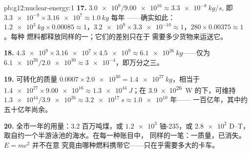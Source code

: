 \begin{solution}{pb:g12:nuclear-energy:1}
\textbf{17.} $\num{3.0e9}/\num{9.00e16} \approx \qty{3.3e-8}{kg/s}$,
即 $\num{3.3e-8} \times \num{3.16e7} \approx \qty{1.0}{kg}$ 每年
——确实如此：$\qty{1.2e3}{kg} \times 0.00085 \approx 1$，$\num{3.2e9}
\times \num{3.3e-10} \approx 1$，$280 \times 0.00375 \approx 1$。每种
燃料都释放同样的一；它们的差别只在于
需要多少货物来运送它。

\textbf{18.} $\num{4.3e9} \times \num{3.16e7} \times \num{4.5e9}
\approx \qty{6.1e26}{kg}$——仅为 $\num{6.1e26}/\num{2.0e30} \approx
\num{3e-4}$，即万分之三。

\textbf{19.} 可转化的质量 $0.0007 \times \num{2.0e30} =
\qty{1.4e27}{kg}$，相当于 $\num{1.4e27} \times \num{9.00e16} \approx
\qty{1.3e44}{J}$；在 \qty{3.9e26}{W} 的下，可维持 $\num{1.3e44}/
\num{3.9e26} \approx \qty{3.2e17}{s} \approx \num{1.0e10}$ 年——
一百亿年，其中约五十亿年尚余。

\textbf{20.} 全市一年的用量：$3.2$ 百万吨煤，或
$\num{1.2e3}$ 铀-235，或 $\num{2.8e2}$ 
D--T，取自约一个半游泳池的海水。在每一种账目中，
同样的一笔：一质量，已消失。$E = mc^2$ 并不在意
究竟由哪种燃料携带它——只在乎需要多大的卡车。
\end{solution}
